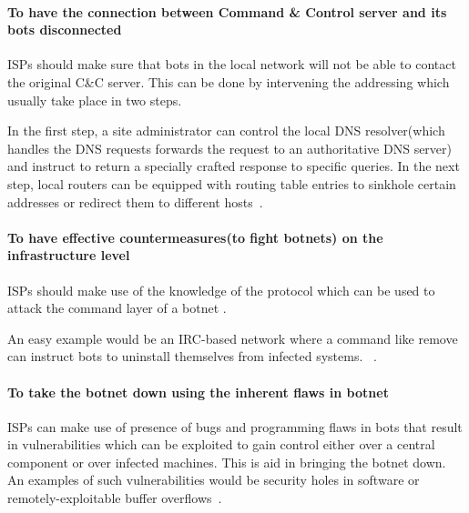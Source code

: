 

\paragraph{To have the connection between Command \& Control server and its bots disconnected}

ISPs should make sure that bots in the local network will not be able to contact the original C\&C server.
This can be done by intervening the addressing which usually take place in two steps.

In the first step, a site administrator can control the local DNS resolver(which handles the DNS requests forwards the request to an authoritative DNS server) and instruct to return a specially crafted response to specific queries. In the next step, local routers can be equipped with routing table entries to sinkhole certain addresses or redirect them to different hosts~\cite{leder2009proactive}.


\paragraph{To have effective countermeasures(to fight botnets) on the infrastructure level}

ISPs should make use of the knowledge of the protocol which can be used to attack the command layer of a botnet .

An easy example would be an IRC-based network where a command like remove can instruct bots to uninstall themselves from infected systems. ~\cite{leder2009proactive}.


\paragraph{To take the botnet down using the inherent flaws in botnet}

ISPs can make use of presence of bugs and programming flaws in bots that result in vulnerabilities which can be exploited to gain control either over a central component or over infected machines. This is aid in bringing the botnet down. An examples of such vulnerabilities would be security holes in software or remotely-exploitable buffer overflows~\cite{leder2009proactive}.

